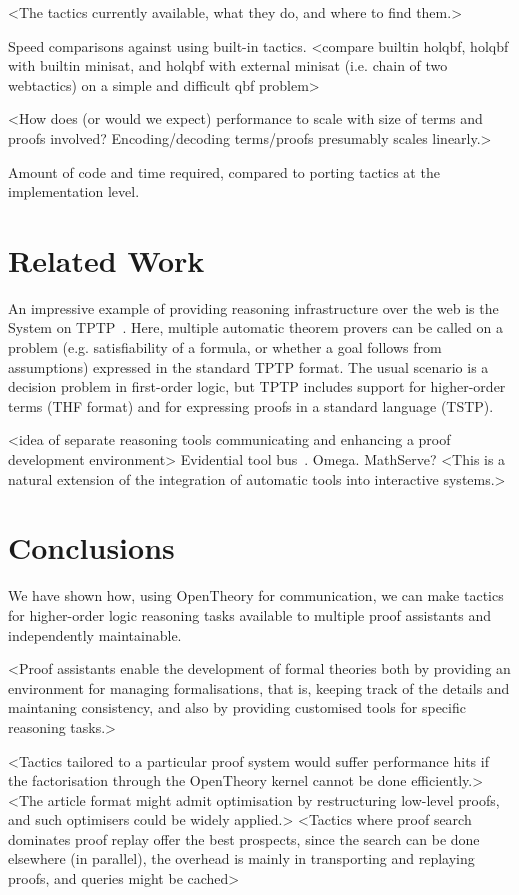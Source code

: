 \documentclass{llncs}
\newcommand{\OpenTheory}{OpenTheory\xspace}
\newcommand{\eg}{e.g.\xspace}
\begin{document}
<The tactics currently available, what they do, and where to find them.>

Speed comparisons against using built-in tactics.
<compare builtin holqbf, holqbf with builtin minisat, and holqbf with external minisat (i.e. chain of two webtactics) on a simple and difficult qbf problem>

<How does (or would we expect) performance to scale with size of terms and proofs involved? Encoding/decoding terms/proofs presumably scales linearly.>

Amount of code and time required, compared to porting tactics at the implementation level.

\section{Related Work}

An impressive example of providing reasoning infrastructure over the web is the System on TPTP~\cite{DBLP:conf/lpar/Sutcliffe10}.
Here, multiple automatic theorem provers can be called on a problem (\eg satisfiability of a formula, or whether a goal follows from assumptions) expressed in the standard TPTP format.
The usual scenario is a decision problem in first-order logic, but TPTP includes support for higher-order terms (THF format) and for expressing proofs in a standard language (TSTP).

<idea of separate reasoning tools communicating and enhancing a proof development environment>
Evidential tool bus~\cite{DBLP:conf/icfem/Rushby05,fk:etb}.
Omega.
MathServe?
<This is a natural extension of the integration of automatic tools into interactive systems.>

\section{Conclusions}

We have shown how, using \OpenTheory for communication, we can make tactics for higher-order logic reasoning tasks available to multiple proof assistants and independently maintainable.

<Proof assistants enable the development of formal theories both by providing an environment for managing formalisations, that is, keeping track of the details and maintaning consistency, and also by providing customised tools for specific reasoning tasks.>

<Tactics tailored to a particular proof system would suffer performance hits if the factorisation through the OpenTheory kernel cannot be done efficiently.>
<The article format might admit optimisation by restructuring low-level proofs, and such optimisers could be widely applied.>
<Tactics where proof search dominates proof replay offer the best prospects, since the search can be done elsewhere (in parallel), the overhead is mainly in transporting and replaying proofs, and queries might be cached>
\end{document}
